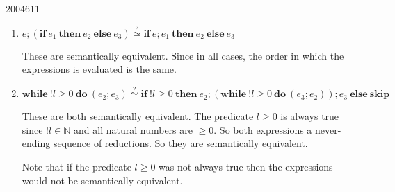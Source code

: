 \documentclass[10pt,\jkfside,a4paper]{article}
\begin{document}
\begin{examquestion}{2004}{6}{11}
\begin{enumerate}
\begin{enumerate}
\item $e; (\mathbf{if} \ e_1 \ \mathbf{then} \ e_2 \ \mathbf{else} \ e_3)
\stackrel{?}{\simeq} \mathbf{if} \ e; e_1 \ \mathbf{then} \ e_2 \
\mathbf{else} \
e_3$

These are semantically equivalent. Since in all cases, the order in which the
expressions is evaluated is the same.

\item $\mathbf{while} \ !l \geq 0 \ \mathbf{do} \ (e_2; e_3)
\stackrel{?}{\simeq} \mathbf{if} \ !l \geq 0 \ \mathbf{then} \ e_2;
(\mathbf{while} \ !l \geq 0 \ \mathbf{do} \ (e_3; e_2)); e_3 \ \mathbf{else}
 \ \mathbf{skip}$

These are both semantically equivalent. The predicate $l \geq 0$ is always
true since $!l \in \mathbb{N}$ and all natural numbers are $\geq 0$. So both
expressions a never-ending sequence of reductions. So they are semantically
equivalent.

Note that if the predicate $l \geq 0$ was not always true then the
expressions would not be semantically equivalent.

\end{enumerate}

\end{enumerate}

\end{examquestion}
\end{document}
